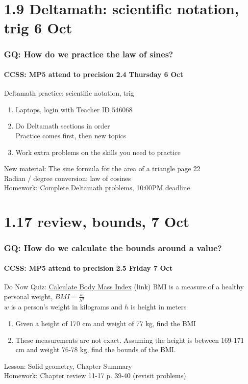 \documentclass{beamer}
\begin{document}
  \section{1.9 Deltamath: scientific notation, trig 6 Oct}
  \frame
  {
    \frametitle{GQ: How do we practice the law of sines?}
    \framesubtitle{CCSS: MP5 attend to precision \hfill \alert{2.4 Thursday 6 Oct}}

    \begin{block}{Deltamath practice: scientific notation, trig}
      \begin{enumerate}
        \item Laptops, login with Teacher ID \alert{546068}
        \item Do Deltamath sections in order \\
        Practice comes first, then new topics
        \item Work extra problems on the skills you need to practice
    \end{enumerate}
    \end{block}
    New material: The sine formula for the area of a triangle page 22\\
    Radian / degree conversion; law of cosines\\ \smallskip
    Homework: Complete Deltamath problems, 10:00PM deadline
  }


  \section{1.17 review, bounds, 7 Oct}
  \frame
  {
    \frametitle{GQ: How do we calculate the bounds around a value?}
    \framesubtitle{CCSS: MP5 attend to precision \hfill \alert{2.5 Friday 7 Oct}}

    \begin{block}{Do Now Quiz: \href{https://www.smartbmicalculator.com/}{Calculate Body Mass Index} (link)}
      BMI is a measure of a healthy personal weight, $\displaystyle BMI = \frac{w}{h^2}$ \\ \smallskip
      $w$ is a person's weight in kilograms and $h$ is height in meters
      \begin{enumerate} 
          \item Given a height of 170 cm and weight of 77 kg, find the BMI
          \item These measurements are not exact. Assuming the height is between 169-171 cm and weight 76-78 kg, find the bounds of the BMI.
       \end{enumerate}
      \end{block}
    Lesson: Solid geometry, Chapter Summary\\ \smallskip
    Homework: Chapter review 11-17 p. 39-40 (revisit problems)
  }
\end{document}
